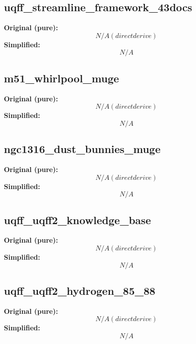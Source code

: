 \subsection{uqff_streamline_framework_43docs}
\textbf{Original (pure):}
\begin{equation}
N/A (direct derive)
\end{equation}
\textbf{Simplified:}
\begin{equation}
N/A
\end{equation}

\subsection{m51_whirlpool_muge}
\textbf{Original (pure):}
\begin{equation}
N/A (direct derive)
\end{equation}
\textbf{Simplified:}
\begin{equation}
N/A
\end{equation}

\subsection{ngc1316_dust_bunnies_muge}
\textbf{Original (pure):}
\begin{equation}
N/A (direct derive)
\end{equation}
\textbf{Simplified:}
\begin{equation}
N/A
\end{equation}

\subsection{uqff_uqff2_knowledge_base}
\textbf{Original (pure):}
\begin{equation}
N/A (direct derive)
\end{equation}
\textbf{Simplified:}
\begin{equation}
N/A
\end{equation}

\subsection{uqff_uqff2_hydrogen_85_88}
\textbf{Original (pure):}
\begin{equation}
N/A (direct derive)
\end{equation}
\textbf{Simplified:}
\begin{equation}
N/A
\end{equation}

